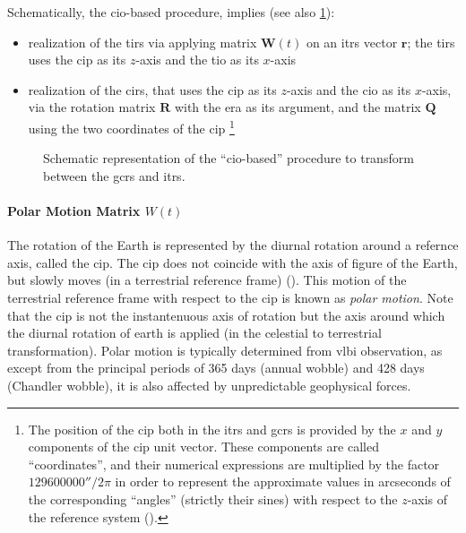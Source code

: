 Schematically, the \gls{cio}-based procedure, implies (see also \ref{fig:itrf-to-icrf}):
\begin{itemize}
    \item realization of the \gls{tirs} via applying matrix $\bm{W}(t)$ on an \gls{itrs} 
        vector $\bm{r}$; the \gls{tirs} uses the \gls{cip} as its $z$-axis and the 
        \gls{tio} as its $x$-axis
    \item realization of the \gls{cirs}, that uses the \gls{cip} as its $z$-axis and the 
        \gls{cio} as its $x$-axis, via the rotation matrix $\bm{R}$ with the \gls{era} 
        as its argument, and the matrix $\bm{Q}$ using the two coordinates of the \gls{cip}
        \footnote{The position of the \gls{cip} both in the \gls{itrs} and \gls{gcrs} is 
        provided by the $x$ and $y$ components of the \gls{cip} unit vector.
        These components are called ``coordinates'', and their numerical expressions 
        are multiplied by the factor $\ang{;;129600000}/2 \pi$ in order to represent the 
        approximate values in arcseconds of the corresponding ``angles'' (strictly 
        their sines) with respect to the $z$-axis of the reference system (\cite{iers2010}).}
\end{itemize}

\begin{figure}
  \centering
  
  \caption{Schematic representation of the ``\gls{cio}-based'' procedure to 
    transform between the \gls{gcrs} and \gls{itrs}.}
  \label{fig:itrf-to-icrf}
\end{figure}

\paragraph{Polar Motion Matrix $W(t)$}\label{par:polar-motion-matrix}
The rotation of the Earth is represented by the diurnal rotation around a
refernce axis, called the \gls{cip}. The \gls{cip} does not coincide with 
the axis of figure of the Earth, but slowly moves (in a terrestrial reference 
frame) (\cite{Urban2013}). This motion of the terrestrial reference frame 
with respect to the \gls{cip} is known as \emph{polar motion}. Note that the 
\gls{cip} is not the instantenuous axis of rotation but the axis around which the 
diurnal rotation of earth is applied (in the celestial to terrestrial 
transformation). Polar motion is typically determined from \gls{vlbi} 
observation, as except from the principal periods of 365 days (annual wobble) 
and 428 days (Chandler wobble), it is also affected by unpredictable geophysical 
forces.

